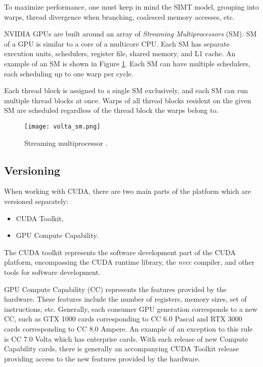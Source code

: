 To maximize performance, one must keep in mind the SIMT model, grouping into warps, thread divergence when branching, coalesced memory accesses, etc.

NVIDIA GPUs are built around an array of \textit{Streaming Multiprocessors} (SM). SM of a GPU is similar to a core of a multicore CPU. Each SM has separate execution units, schedulers, register file, shared memory, and L1 cache. An example of an SM is shown in Figure \ref{fig:volta_sm}. Each SM can have multiple schedulers, each scheduling up to one warp per cycle. 

Each thread block is assigned to a single SM exclusively, and each SM can run multiple thread blocks at once. Warps of all thread blocks resident on the given SM are scheduled regardless of the thread block the warps belong to.


\begin{figure}[ht]
	\centering
	\texttt{[image: volta\_sm.png]}
	\caption{Streaming multiprocessor \citep{paper:volta}.}
	\label{fig:volta_sm}
\end{figure}

\subsection{Versioning}

When working with CUDA, there are two main parts of the platform which are versioned separately: %
\begin{itemize}
	\item CUDA Toolkit,
	\item GPU Compute Capability.
\end{itemize}

The CUDA toolkit represents the software development part of the CUDA platform, encompassing the CUDA runtime library, the \textit{nvcc} compiler, and other tools for software development.

GPU Compute Capability (CC) represents the features provided by the hardware. These features include the number of registers, memory sizes, set of instructions, etc. Generally, each consumer GPU generation corresponds to a new CC, such as GTX 1000 cards corresponding to CC 6.0 Pascal and RTX 3000 cards corresponding to CC 8.0 Ampere. An example of an exception to this rule is CC 7.0 Volta which has enterprise cards. With each release of new Compute Capability cards, there is generally an accompanying CUDA Toolkit release providing access to the new features provided by the hardware. 

